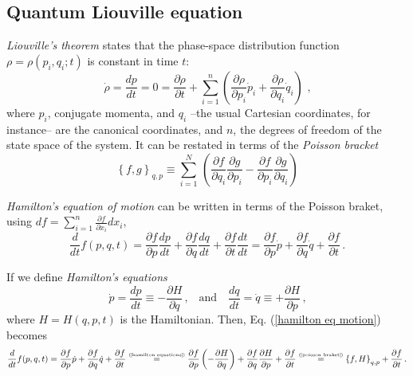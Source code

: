 \documentclass[11pt]{article}
\numberwithin{equation}{section} %
\numberwithin{figure}{section} %
\newcommand\numeq[1] %
  {\stackrel{\scriptscriptstyle(\mkern-1.5mu#1\mkern-1.5mu)}{=}}
\begin{document}
\begin{appendices}
\section{Quantum Liouville equation}
\emph{Liouville's theorem} states that the phase-space distribution function $\rho=\rho(p_i,q_i; t)$ is constant in time $t$:
\begin{equation} \label{Liouville theorem}
\dot{\rho}=\frac{dp}{dt}=0=\frac{\partial\rho}{\partial t}+\sum_{i=1}^{n}\left( \frac{\partial\rho}{\partial p_i}\dot{p}_i+\frac{\partial\rho}{\partial q_i}\dot{q}_i \right)\,\,\textrm{,}
\end{equation}
where $p_i$, conjugate momenta, and $q_i$ --the usual Cartesian coordinates, for instance-- are the canonical coordinates, and $n$, the degrees of freedom of the state space of the system. It can be restated in terms of the \emph{Poisson bracket} $\,$ \cite[p.~49, Eq.~(1.6.48)]{Sakurai}
\begin{equation} \label{poisson braket}
\left\lbrace f,g \right\rbrace_{q,p}\equiv\sum_{i=1}^N\,\left( \frac{\partial f}{\partial q_i}\frac{\partial g}{\partial p_i}-\frac{\partial f}{\partial p_i}\frac{\partial g}{\partial q_i} \right)
\end{equation}

\emph{Hamilton's equation of motion} can be written in terms of the Poisson braket, using $df=\sum_{i=1}^n\frac{\partial f}{\partial x_i}dx_i$,
\begin{equation} \label{hamilton eq motion}
\frac{d}{dt}f(p,q,t)=\frac{\partial f}{\partial p}\frac{dp}{dt}+\frac{\partial f}{\partial q}\frac{dq}{dt}+ \frac{\partial f}{\partial t}\frac{dt}{dt}=\frac{\partial f}{\partial p}\dot{p}+\frac{\partial f}{\partial q}\dot{q}+ \frac{\partial f}{\partial t}\,\textrm{.}
\end{equation}

If we define \emph{Hamilton's equations}
\begin{equation} \label{hamilton equations}
\dot{p}=\frac{dp}{dt}\equiv-\frac{\partial H}{\partial q}\,\textrm{,}\quad \textrm{and}\quad\frac{dq}{dt}=\dot{q}\equiv+\frac{\partial H}{\partial p}\,\textrm{,}
\end{equation}
where $H=H(q,p,t)$ is the Hamiltonian. Then, Eq. (\ref{hamilton eq motion}) becomes
\begin{equation} \label{hamilton with poisson}
\frac{d}{dt}f(p,q,t)=\frac{\partial f}{\partial p}\dot{p}+\frac{\partial f}{\partial q}\dot{q}+ \frac{\partial f}{\partial t}\numeq{\textrm{\ref{hamilton equations}}}\frac{\partial f}{\partial p}\left(-\frac{\partial H}{\partial q}\right)+\frac{\partial f}{\partial q}\frac{\partial H}{\partial p}+ \frac{\partial f}{\partial t}\numeq{\textrm{\ref{poisson braket}}}\left\lbrace f,H \right\rbrace_{q,p}+ \frac{\partial f}{\partial t}\,\textrm{.}
\end{equation}


\end{appendices}
\end{document}
